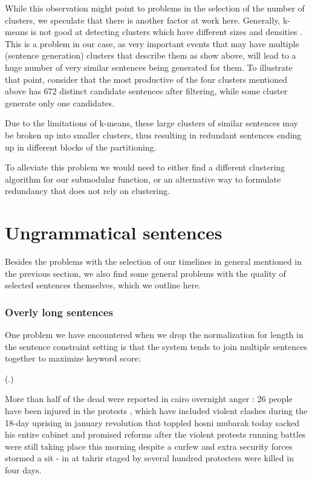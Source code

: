 \documentclass[a4paper,BCOR=10mm]{report}
\newcounter{quotecount}[chapter]
\newcommand{\countquotenosource}[1]{\vspace{1cm}\refstepcounter{quotecount}%
     (\thechapter.\arabic{quotecount}) \hspace*{1cm} \parbox{9cm}{#1}\\[1cm]}
\numberwithin{lemma}{chapter}
\numberwithin{definition}{chapter}
\begin{document}
While this observation might point to problems in the selection of the number of clusters, we speculate that there is another factor at work here.
Generally, k-means is not good at detecting clusters which have different sizes and densities \citep{introduction-data-mining-tan}.
This is a problem in our case, as very important events that may have multiple (sentence generation) clusters that describe them as show above, will lead to a huge number of very similar sentences being generated for them. To illustrate that point, consider that the most productive of the four clusters mentioned above has 672 distinct candidate sentences after filtering, while some cluster generate only one candidates.

Due to the limitations of k-means, these large clusters of similar sentences may be broken up into smaller clusters, thus resulting in redundant sentences ending up in different blocks of the partitioning.

To alleviate this problem we would need to either find a different clustering algorithm for our submodular function, or an alternative way to formulate redundancy that does not rely on clustering.

\section{Ungrammatical sentences} \label{sec:errors-grammar}

Besides the problems with the selection of our timelines in general mentioned in the previous section, we also find some general problems with the quality of selected sentences themselves, which we outline here.

\subsubsection{Overly long sentences}

One problem we have encountered when we drop the normalization for length in the sentence constraint setting is that the system tends to join multiple sentences together to maximize keyword score:

\countquotenosource{
More than half of the dead were reported in cairo overnight anger : 26 people have been injured in the protests , which have included violent clashes during the 18-day uprising in january revolution that toppled hosni mubarak today sacked his entire cabinet and promised reforms after the violent protests running battles were still taking place this morning despite a curfew and extra security forces stormed a sit - in at tahrir staged by several hundred protesters were killed in four days.
}
\end{document}
